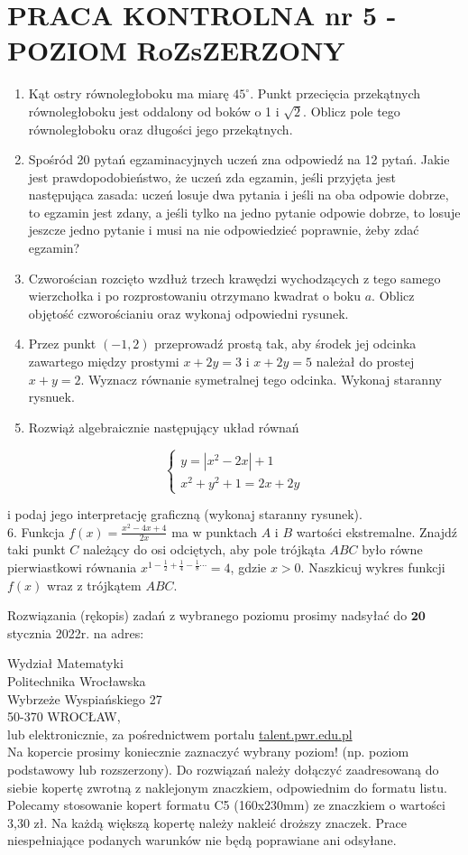 \documentclass[10pt]{article}
\begin{document}
\section*{PRACA KONTROLNA nr 5 - POZIOM RoZsZERZONY}
\begin{enumerate}
  \item Kąt ostry równoległoboku ma miarę $45^{\circ}$. Punkt przecięcia przekątnych równoległoboku jest oddalony od boków o 1 i $\sqrt{2}$. Oblicz pole tego równoległoboku oraz długości jego przekątnych.
  \item Spośród 20 pytań egzaminacyjnych uczeń zna odpowiedź na 12 pytań. Jakie jest prawdopodobieństwo, że uczeń zda egzamin, jeśli przyjęta jest następująca zasada: uczeń losuje dwa pytania i jeśli na oba odpowie dobrze, to egzamin jest zdany, a jeśli tylko na jedno pytanie odpowie dobrze, to losuje jeszcze jedno pytanie i musi na nie odpowiedzieć poprawnie, żeby zdać egzamin?
  \item Czworościan rozcięto wzdłuż trzech krawędzi wychodzących z tego samego wierzchołka i po rozprostowaniu otrzymano kwadrat o boku $a$. Oblicz objętość czworościaniu oraz wykonaj odpowiedni rysunek.
  \item Przez punkt $(-1,2)$ przeprowadź prostą tak, aby środek jej odcinka zawartego między prostymi $x+2 y=3$ i $x+2 y=5$ należał do prostej $x+y=2$. Wyznacz równanie symetralnej tego odcinka. Wykonaj staranny rysnuek.
  \item Rozwiąż algebraicznie następujący układ równań
\end{enumerate}

$$
\left\{\begin{array}{l}
y=\left|x^{2}-2 x\right|+1 \\
x^{2}+y^{2}+1=2 x+2 y
\end{array}\right.
$$

i podaj jego interpretację graficzną (wykonaj staranny rysunek).\\
6. Funkcja $f(x)=\frac{x^{2}-4 x+4}{2 x}$ ma w punktach $A$ i $B$ wartości ekstremalne. Znajdź taki punkt $C$ należący do osi odciętych, aby pole trójkąta $A B C$ było równe pierwiastkowi równania $x^{1-\frac{1}{2}+\frac{1}{4}-\frac{1}{8} \cdots}=4$, gdzie $x>0$. Naszkicuj wykres funkcji $f(x)$ wraz z trójkątem $A B C$.

Rozwiązania (rękopis) zadań z wybranego poziomu prosimy nadsyłać do $\mathbf{2 0}$ stycznia 2022r. na adres:

Wydział Matematyki\\
Politechnika Wrocławska\\
Wybrzeże Wyspiańskiego 27\\
50-370 WROCŁAW,\\
lub elektronicznie, za pośrednictwem portalu \href{http://talent.pwr.edu.pl}{talent.pwr.edu.pl}\\
Na kopercie prosimy koniecznie zaznaczyć wybrany poziom! (np. poziom podstawowy lub rozszerzony). Do rozwiązań należy dołączyć zaadresowaną do siebie kopertę zwrotną z naklejonym znaczkiem, odpowiednim do formatu listu. Polecamy stosowanie kopert formatu C5 (160x230mm) ze znaczkiem o wartości 3,30 zł. Na każdą większą kopertę należy nakleić droższy znaczek. Prace niespełniające podanych warunków nie będą poprawiane ani odsyłane.
\end{document}
